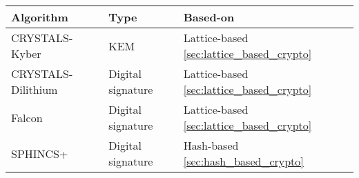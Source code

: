 \begin{tabular}{|l|l|l|}
  \hline
  Algorithm          & Type              & Based-on                                     \\
  \hline
  CRYSTALS-Kyber     & KEM               & Lattice-based \ref{sec:lattice_based_crypto} \\
  CRYSTALS-Dilithium & Digital signature & Lattice-based \ref{sec:lattice_based_crypto} \\
  Falcon             & Digital signature & Lattice-based \ref{sec:lattice_based_crypto} \\
  SPHINCS+           & Digital signature & Hash-based \ref{sec:hash_based_crypto}       \\
  \hline
\end{tabular}
